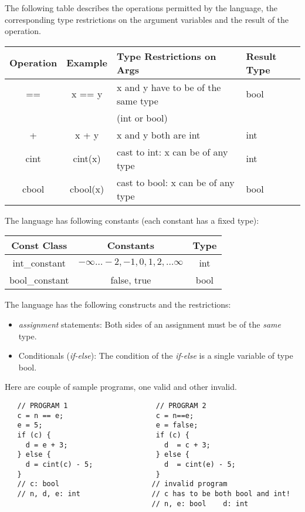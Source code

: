 \documentclass[12pt]{article}
\begin{document}
\begin{enumerate}
  The following table describes the operations permitted by
  the language, the corresponding type restrictions on the
  argument variables and the result of the operation.
  \begin{center}
    \begin{tabular}{|c|c|l|l|}\hline
      {\bf Operation} & {\bf Example} & {\bf Type Restrictions
        on Args} & {\bf Result Type} \\\hline\hline
      == & x == y & x and y have to be of the same type & bool \\
                      & & (int or bool) & \\\hline
      +  & x + y & x and y both are int & int \\\hline
      cint & cint(x) &  cast to int: x can be of any type & int \\\hline
      cbool & cbool(x) &  cast to bool: x can be of any type & bool \\\hline
    \end{tabular}
  \end{center}
  The language has following constants (each constant has a fixed type):
  \begin{center}
    \begin{tabular}{|c|c|c|} \hline
      {\bf Const Class} & {\bf Constants} & {\bf Type} \\ \hline \hline
      int\_constant & $-\infty\ldots -2, -1, 0, 1, 2, \ldots
      \infty$ & int \\ \hline 
      bool\_constant & false, true & bool \\ \hline
    \end{tabular}
  \end{center}
 The language has the following constructs and the restrictions:
 \begin{itemize}
 \item {\em assignment} statements: Both sides of an assignment
   must be of the {\em same} type.
 \item Conditionals ({\em if-else}): The condition of the {\em
     if-else} is a single variable of type bool.
 \end{itemize}
 Here are couple of sample programs, one valid and other invalid.
\begin{verbatim}
   // PROGRAM 1                     // PROGRAM 2
   c = n == e;                      c = n==e;
   e = 5;                           e = false;
   if (c) {                         if (c) {
     d = e + 3;                       d  = c + 3;
   } else {                         } else { 
     d = cint(c) - 5;                 d  = cint(e) - 5;
   }                                }
   // c: bool                      // invalid program
   // n, d, e: int                 // c has to be both bool and int! 
                                   // n, e: bool    d: int 
\end{verbatim}


\end{enumerate}
\end{document}
